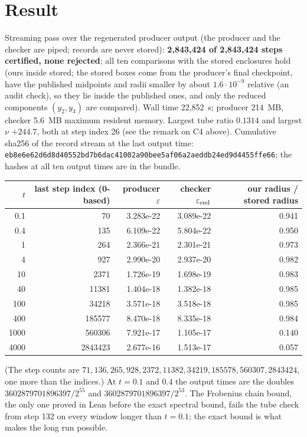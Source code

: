 \documentclass[11pt]{article}
\begin{document}
\section{Result}
Streaming pass over the regenerated producer output (the producer and the checker are piped; records are never stored): \textbf{2{,}843{,}424 of 2{,}843{,}424 steps certified, none rejected}; all ten comparisons with the
stored enclosures hold (ours inside stored; the stored boxes come from the producer's final checkpoint, have the published midpoints and radii smaller by about $1.6\cdot10^{-9}$ relative (an audit check), so they lie inside the published ones, and only the reduced components $(y_2,y_3)$ are compared). Wall time 22{,}852~s; producer 214~MB, checker 5.6~MB maximum resident memory.
Largest tube ratio $0.1314$ and largest $\nu$ $+244.7$, both at step index 26 (see the remark on C4 above). Cumulative sha256 of the record stream at the last output time:
\texttt{eb8e6e62d6d8d40552bd7b6dac41002a90bee5af06a2aeddb24ed9d4455ffe66}; the hashes at all ten output times are in the bundle.
\begin{center}\small
\begin{tabular}{@{}rrrrr@{}}
\toprule
$t$ & last step index (0-based) & producer $\varepsilon$ & checker $\varepsilon_{\rm end}$ & our radius / stored radius \\
\midrule
0.1 & 70 & 3.283e-22 & 3.089e-22 & 0.941 \\
0.4 & 135 & 6.109e-22 & 5.804e-22 & 0.950 \\
1 & 264 & 2.366e-21 & 2.301e-21 & 0.973 \\
4 & 927 & 2.990e-20 & 2.937e-20 & 0.982 \\
10 & 2371 & 1.726e-19 & 1.698e-19 & 0.983 \\
40 & 11381 & 1.404e-18 & 1.382e-18 & 0.985 \\
100 & 34218 & 3.571e-18 & 3.518e-18 & 0.985 \\
400 & 185577 & 8.470e-18 & 8.335e-18 & 0.984 \\
1000 & 560306 & 7.921e-17 & 1.105e-17 & 0.140 \\
4000 & 2843423 & 2.677e-16 & 1.513e-17 & 0.057 \\
\bottomrule
\end{tabular}
\end{center}
(The step counts are $71,136,265,928,2372,11382,34219,185578,560307,2843424$, one more than the indices.) At $t=0.1$ and $0.4$ the output times are the doubles $3602879701896397/2^{55}$ and $3602879701896397/2^{53}$.
The Frobenius chain bound, the only one proved in Lean before the exact spectral bound, fails the tube check from step 132 on every window longer than $t=0.1$; the exact
bound is what makes the long run possible.
\end{document}
